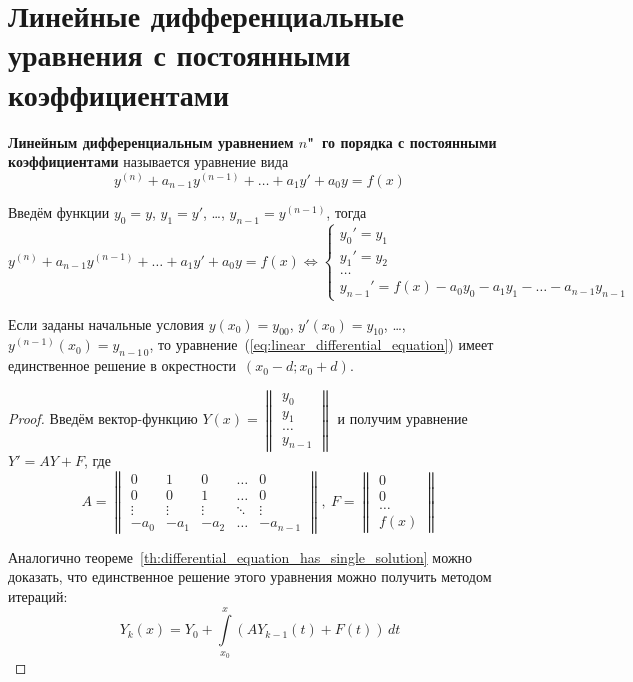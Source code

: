 \section{Линейные дифференциальные уравнения с постоянными коэффициентами}
 \textbf{Линейным дифференциальным уравнением $n$"~го порядка с постоянными коэффициентами} называется уравнение вида
\begin{equation}
\label{eq:linear_differential_equation}
y^{(n)} + a_{n-1} y^{(n-1)} + \ldots + a_1 y' + a_0 y = f(x)
\end{equation}

Введём функции $y_0 = y$, $y_1 = y'$, \ldots, $y_{n-1} = y^{(n-1)}$, тогда
\begin{equation*}
y^{(n)} + a_{n-1} y^{(n-1)} + \ldots + a_1 y' + a_0 y = f(x) \Leftrightarrow
\begin{cases}
y_0' = y_1 \\
y_1' = y_2 \\
\ldots \\
y_{n-1}' = f(x) - a_0 y_0 - a_1 y_1 - \ldots - a_{n-1} y_{n-1}
\end{cases}
\end{equation*}

\begin{theorem}
Если заданы начальные условия $y(x_0) = y_{00}$, $y'(x_0) = y_{10}$, \ldots, $y^{(n-1)}(x_0) = y_{n-1\,0}$, то уравнение~(\ref*{eq:linear_differential_equation}) имеет единственное решение в окрестности~$(x_0 - d; x_0 + d)$.
\end{theorem}
\begin{proof}
Введём вектор-функцию $Y(x) =
\begin{Vmatrix}
y_0 \\
y_1 \\
\ldots \\
y_{n-1}
\end{Vmatrix}$
и получим уравнение $Y' = A Y + F$, где
\begin{equation*}
A =
\begin{Vmatrix}
0 & 1 & 0 & \ldots & 0 \\
0 & 0 & 1 & \ldots & 0 \\
\vdots & \vdots & \vdots & \ddots & \vdots \\
-a_0 & -a_1 & -a_2 & \ldots & -a_{n-1}
\end{Vmatrix}, \
F =
\begin{Vmatrix}
0 \\
0 \\
\ldots \\
f(x)
\end{Vmatrix}
\end{equation*}

Аналогично теореме~\ref{th:differential_equation_has_single_solution} можно доказать, что единственное решение этого уравнения можно получить методом итераций:
\begin{equation*}
Y_k(x) = Y_0 + \int\limits_{x_0}^x (A Y_{k-1}(t) + F(t))\,dt
\end{equation*}
\end{proof}

